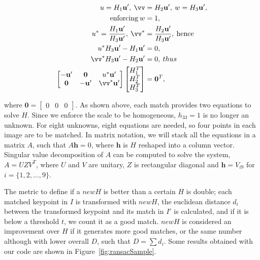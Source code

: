 \documentclass[12pt]{article}
\begin{document}
\begin{equation}
\begin{aligned}
	u = H_1 \mathbf{u'}, \: \vv &= H_2 \mathbf{u'}, \: w = H_3 \mathbf{u'}, \\ 
	\text{enforcing} \: w &= 1, \\
	u^* = \frac{H_1 \mathbf{u'}}{ H_3 \mathbf{u'}}, \: \vv^* &= \frac{H_2 \mathbf{u'}}{ H_3 \mathbf{u'}}, \: \text{hence} \\	
	u^*H_3\mathbf{u'} - H_1\mathbf{u'} &= 0, \\
	\vv^* H_3\mathbf{u'} - H_2\mathbf{u'} &= 0, \: thus\\
	\begin{bmatrix}
	-\mathbf{u'} & \mathbf{0} & u^*\mathbf{u'} \\
	\mathbf{0} & -\mathbf{u'} & \vv^*\mathbf{u'}
	\end{bmatrix}
	\begin{bmatrix}
	H_1^T \\
	H_2^T \\ 
	H_3^T 
	\end{bmatrix}
	&= \mathbf{0}^T,
\end{aligned}
\label{eq:derivatingH}
\end{equation}

where $\mathbf{0} = \begin{bmatrix} 0 & 0 & 0 \end{bmatrix}$. 
As shown above, each match provides two equations to solve $H$.
Since we enforce the scale to be homogeneous, $h_{33} = 1$ is no longer an unknown.
For eight unknowns, eight equations are needed, so four points in each image are to be matched.
In matrix notation, we will stack all the equations in a matrix $A$, such that $A\mathbf{h}=0$, where $\mathbf{h}$ is $H$ reshaped into a column vector.
Singular value decomposition of $A$ can be computed to solve the system, $A = UZV^T$, where $U$ and $V$ are unitary, $Z$ is rectangular diagonal and $\mathbf{h} = V_{i9}$ for $i = \lbrace 1,2, \ldots, 9 \rbrace$.

The metric to define if a $newH$ is better than a certain $H$ is double; each matched keypoint in $I$ is transformed with $newH$, the euclidean distance $d_i$ between the transformed keypoint and its match in $I'$ is calculated, and if it is below a threshold $t$, we count it as a good match.
$newH$ is considered an improvement over $H$ if it generates more good matches, or the same number although with lower overall $D$, such that $D = \sum d_i $.
Some results obtained with our code are shown in Figure~\ref{fig:ransacSample}.
\end{document}
